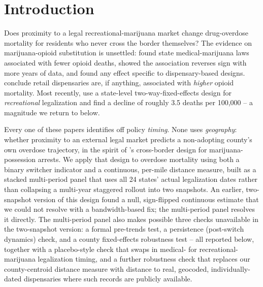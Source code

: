 \documentclass[preprint,12pt,authoryear]{elsarticle}
\begin{document}
\vspace{0.4cm}

\section{Introduction}

Does proximity to a legal recreational-marijuana market change
drug-overdose mortality for residents who never cross the border
themselves? The evidence on marijuana-opioid substitution is
unsettled: \citet{Bachhuber2014} found state medical-marijuana laws
associated with fewer opioid deaths, \citet{Shover2019} showed the
association reverses sign with more years of data, and
\citet{PowellPaculaJacobson2018} found any effect specific to
dispensary-based designs. \citet{MathurRuhm2022} conclude retail
dispensaries are, if anything, associated with \emph{higher} opioid
mortality. Most recently, \citet{Denkyirah2026} use a state-level
two-way-fixed-effects design for \emph{recreational} legalization and
find a decline of roughly 3.5 deaths per 100,000 -- a magnitude we
return to below.

Every one of these papers identifies off policy \emph{timing}. None
uses \emph{geography}: whether proximity to an external legal market
predicts a non-adopting county's own overdose trajectory, in the
spirit of \citet{HaoCowan2020}'s cross-border design for
marijuana-possession arrests. We apply that design to overdose
mortality using both a binary switcher indicator and a continuous,
per-mile distance measure, built as a stacked multi-period panel that
uses all 24 states' actual legalization dates rather than collapsing a
multi-year staggered rollout into two snapshots. An earlier,
two-snapshot version of this design found a null, sign-flipped
continuous estimate that we could not resolve with a bandwidth-based
fix; the multi-period panel resolves it directly. The multi-period
panel also makes possible three checks unavailable in the two-snapshot
version: a formal pre-trends test, a persistence (post-switch
dynamics) check, and a county fixed-effects robustness test -- all
reported below, together with a placebo-style check that swaps in
medical- for recreational-marijuana legalization timing, and a further
robustness check that replaces our county-centroid distance measure
with distance to real, geocoded, individually-dated dispensaries where
such records are publicly available.
\end{document}

